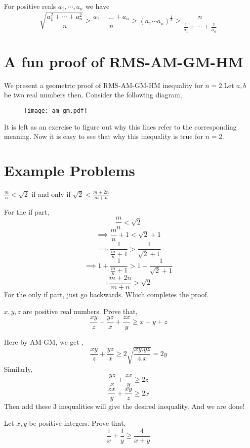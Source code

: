  \begin{theorem}
 For positive reals $a_1, \cdots  ,a_n$ we have
        \[\sqrt {\frac{a_1^2+ \cdots +a_n^2}{n}} \ge \frac{ a_1+...+a_n}{n} \ge (a_1 \cdots a_n)^{\frac{1}{n}} \ge \frac{n}{\frac{1}{a_1}+\cdots+ \frac{1}{a_n}} \]
 \end{theorem}
 
\section {A fun proof of RMS-AM-GM-HM}
We present a geometric proof of RMS-AM-GM-HM inequality for $n=2$.Let $a,b $ be two real numbers then. Consider the following diagram,
\begin{figure}[ht]
\centering
    \texttt{[image: am-gm.pdf]}
    \label{label of the figure}         
\end{figure}
It is left as an exercise to figure out why this lines refer to the corresponding meaning. 
Now it is easy to see that why this inequality is true for $n=2$. 

\section{Example Problems}

\begin{example}
$\frac{m}{n}<\sqrt{2}$ if and only if  $\sqrt{2} < \frac{m+2n}{m+n}$

\end{example}
\begin{soln}
    For the if part, \[ \frac{m}{n}<\sqrt{2} \]
    \[ \implies  \frac{m}{n} +1 < \sqrt{2} +1\]
    \[ \implies \frac{1}{\frac{m}{n} +1 }> \frac{1}{\sqrt{2}+1} \]
    \[ \implies 1 + \frac{1}{\frac{m}{n} +1 }> 1 +\frac{1}{\sqrt{2}+1} \]
    \[ \therefore \frac{m+2n}{m+n} > \sqrt {2} \]
    For the only if part, just go backwards. Which completes the proof.
\end{soln}


\begin{example}
$x,y,z $ are positive real numbers. Prove that,
\[\frac{xy}{z}+\frac{yz}{x}+\frac{zx}{y}\ge x+y+z\]
\end{example}
 \begin{soln}
 Here by AM-GM, we get ,
 \[\frac{xy}{z}+\frac{yz}{x}\ge 2 \sqrt {\frac{xy.yz}{z.x}}= 2y\]
 Similarly,
 \[\frac{yz}{x}+\frac{zx}{y}\ge 2z\]
     \[ \frac{zx}{y}+\frac{xy}{z} \ge 2x\]
     Then add these 3 inequalities will give the desired inequality. And we are done!
 \end{soln}
\begin{example}
Let $x,y $ be positive integers. Prove that, 
\[\frac{1}{x} + \frac{1}{y} \ge \frac{4}{x+y}\]
\end{example}

